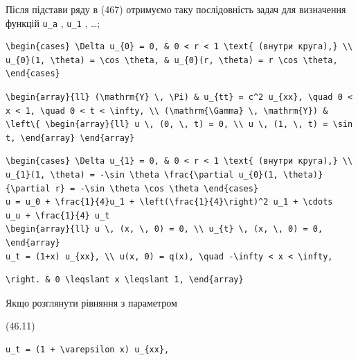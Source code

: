 \documentclass[
  ukrainian,
]{article}
\begin{document}
Після підстави ряду в (467) отримуємо таку послідовність задач для
визначення функцій \texttt{u\_a} , \texttt{u\_1} , \ldots;

\begin{verbatim}
\begin{cases} \Delta u_{0} = 0, & 0 < r < 1 \text{ (внутри круга),} \\ u_{0}(1, \theta) = \cos \theta, & u_{0}(r, \theta) = r \cos \theta, \end{cases}
\end{verbatim}

\begin{verbatim}
\begin{array}{ll} (\mathrm{Y} \, \Pi) & u_{tt} = c^2 u_{xx}, \quad 0 < x < 1, \quad 0 < t < \infty, \\ (\mathrm{\Gamma} \, \mathrm{Y}) & \left\{ \begin{array}{ll} u \, (0, \, t) = 0, \\ u \, (1, \, t) = \sin t, \end{array} \end{array}
\end{verbatim}

\begin{verbatim}
\begin{cases} \Delta u_{1} = 0, & 0 < r < 1 \text{ (внутри круга),} \\ u_{1}(1, \theta) = -\sin \theta \frac{\partial u_{0}(1, \theta)}{\partial r} = -\sin \theta \cos \theta \end{cases}
u = u_0 + \frac{1}{4}u_1 + \left(\frac{1}{4}\right)^2 u_1 + \cdots
u_u + \frac{1}{4} u_t
\begin{array}{ll} u \, (x, \, 0) = 0, \\ u_{t} \, (x, \, 0) = 0, \end{array}
u_t = (1+x) u_{xx}, \\ u(x, 0) = q(x), \quad -\infty < x < \infty,
\end{verbatim}

\begin{verbatim}
\right. & 0 \leqslant x \leqslant 1, \end{array}
\end{verbatim}

Якщо розглянути рівняння з параметром

(46.11)

\begin{verbatim}
u_t = (1 + \varepsilon x) u_{xx},
\end{verbatim}
\end{document}
